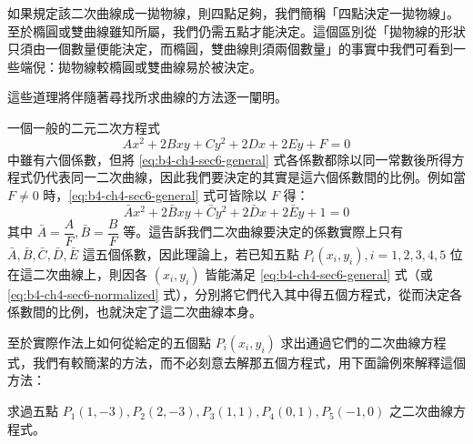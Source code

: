如果規定該二次曲線成一拋物線，則四點足夠，我們簡稱「四點決定一拋物線」。至於橢圓或雙曲線雖知所屬，我們仍需五點才能決定。這個區別從「拋物線的形狀只須由一個數量便能決定，而橢圓，雙曲線則須兩個數量」的事實中我們可看到一些端倪：拋物線較橢圓或雙曲線易於被決定。

這些道理將伴隨著尋找所求曲線的方法逐一闡明。

一個一般的二元二次方程式
\begin{equation}
Ax^2 + 2Bxy + Cy^2 + 2Dx + 2Ey + F = 0
\label{eq:b4-ch4-sec6-general}
\end{equation}
中雖有六個係數，但將 \eqref{eq:b4-ch4-sec6-general} 式各係數都除以同一常數後所得方程式仍代表同一二次曲線，因此我們要決定的其實是這六個係數間的比例。例如當 $F \ne 0$ 時，\eqref{eq:b4-ch4-sec6-general} 式可皆除以 $F$ 得：
\begin{equation}
\bar{A}x^2 + 2\bar{B}xy + \bar{C}y^2 + 2\bar{D}x + 2\bar{E}y + 1 = 0
\label{eq:b4-ch4-sec6-normalized}
\end{equation}
其中 $\bar{A} = \dfrac{A}{F}, \bar{B} = \dfrac{B}{F}$ 等。這告訴我們二次曲線要決定的係數實際上只有 $\bar{A}, \bar{B}, \bar{C}, \bar{D}, \bar{E}$ 這五個係數，因此理論上，若已知五點 $P_i(x_i, y_i), i=1,2,3,4,5$ 位在這二次曲線上，則因各 $(x_i, y_i)$ 皆能滿足 \eqref{eq:b4-ch4-sec6-general} 式（或 \eqref{eq:b4-ch4-sec6-normalized} 式），分別將它們代入其中得五個方程式，從而決定各係數間的比例，也就決定了這二次曲線本身。

至於實際作法上如何從給定的五個點 $P_i(x_i, y_i)$ 求出通過它們的二次曲線方程式，我們有較簡潔的方法，而不必刻意去解那五個方程式，用下面論例來解釋這個方法：

\begin{discussion}
求過五點 $P_1(1, -3), P_2(2, -3), P_3(1, 1), P_4(0, 1), P_5(-1, 0)$ 之二次曲線方程式。
\end{discussion}

